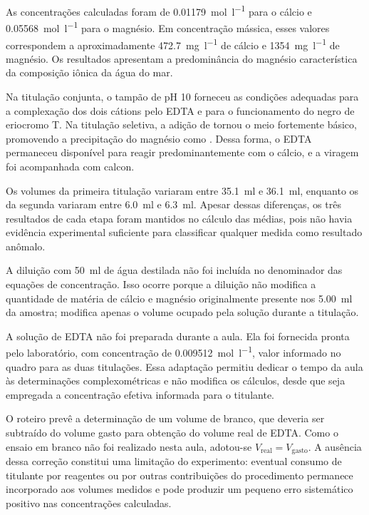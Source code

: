 \documentclass[a4paper,12pt]{article}
\begin{document}
As concentrações calculadas foram de
\qty{0.01179}{\mole\per\litre} para o cálcio e
\qty{0.05568}{\mole\per\litre} para o magnésio. Em concentração mássica,
esses valores correspondem a aproximadamente \qty{472.7}{\milli\gram\per\litre}
de cálcio e \qty{1354}{\milli\gram\per\litre} de magnésio. Os resultados
apresentam a predominância do magnésio característica da composição iônica
da água do mar.

Na titulação conjunta, o tampão de pH 10 forneceu as condições adequadas
para a complexação dos dois cátions pelo EDTA e para o funcionamento do
negro de eriocromo T. Na titulação seletiva, a adição de  tornou
o meio fortemente básico, promovendo a precipitação do magnésio como
. Dessa forma, o EDTA permaneceu disponível para reagir
predominantemente com o cálcio, e a viragem foi acompanhada com calcon.

Os volumes da primeira titulação variaram entre
\qty{35.1}{\milli\litre} e \qty{36.1}{\milli\litre}, enquanto os da
segunda variaram entre \qty{6.0}{\milli\litre} e
\qty{6.3}{\milli\litre}. Apesar dessas diferenças, os três resultados de
cada etapa foram mantidos no cálculo das médias, pois não havia evidência
experimental suficiente para classificar qualquer medida como resultado
anômalo.

A diluição com \qty{50}{\milli\litre} de água destilada não foi incluída
no denominador das equações de concentração. Isso ocorre porque a diluição
não modifica a quantidade de matéria de cálcio e magnésio originalmente
presente nos \qty{5.00}{\milli\litre} da amostra; modifica apenas o volume
ocupado pela solução durante a titulação.

A solução de EDTA não foi preparada durante a aula. Ela foi fornecida pronta
pelo laboratório, com concentração de
\qty{0.009512}{\mole\per\litre}, valor informado no quadro para as duas
titulações. Essa adaptação permitiu dedicar o tempo da aula às determinações
complexométricas e não modifica os cálculos, desde que seja empregada a
concentração efetiva informada para o titulante.

O roteiro prevê a determinação de um volume de branco, que deveria ser
subtraído do volume gasto para obtenção do volume real de EDTA. Como o ensaio
em branco não foi realizado nesta aula, adotou-se
$V_{\text{real}}=V_{\text{gasto}}$. A ausência dessa correção constitui uma
limitação do experimento: eventual consumo de titulante por reagentes ou por
outras contribuições do procedimento permanece incorporado aos volumes
medidos e pode produzir um pequeno erro sistemático positivo nas
concentrações calculadas.
\end{document}
